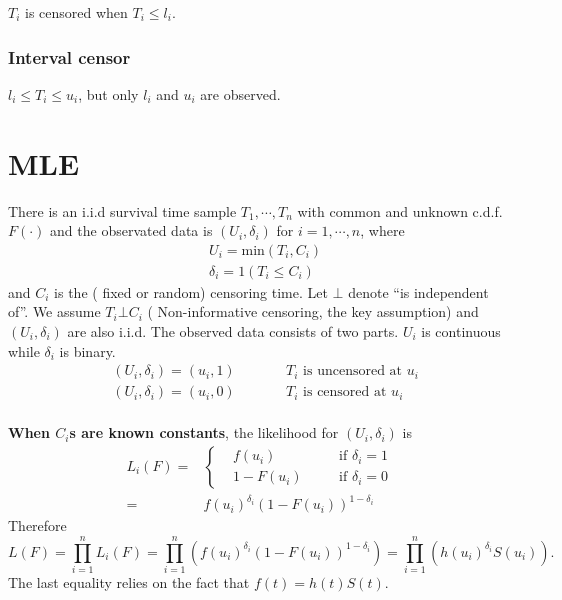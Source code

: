 \documentclass[a4paper,12pt]{article}
\begin{document}
$T_i$ is censored when $T_i \leq l_i$.

\subsubsection{Interval censor}
\label{sec:interval-censor}

$l_i \leq T_i \leq u_i$, but only $l_i$ and $u_i$ are observed.

\section{MLE}
\label{sec:mle}

There is an i.i.d survival time sample $T_1, \cdots, T_n$ with common and unknown c.d.f. $F\left(\cdot\right)$ and the observated data is $\left(U_i, \delta_i\right)$ for $i = 1, \cdots, n$, where
\[
  \begin{aligned}
    & U_i = \mathrm{min}\left(T_i, C_i\right)    \\
    & \delta_i = 1\left(T_i \leq C_i\right)
  \end{aligned}
\]
and $C_i$ is the ({\color{red} fixed} or {\color{red} random}) censoring time. Let $\bot$ denote ``is independent of''. We assume $T_i\bot C_i$ ({\color{red} Non-informative censoring, the key assumption}) and $\left(U_i, \delta_i\right)$ are also i.i.d. The observed data consists of two parts. $U_i$ is continuous while $\delta_i$ is binary.
\[
  \begin{aligned}
    & \left(U_i, \delta_i\right) = \left(u_i, 1\right)
    && \quad\quad T_i \text{ is uncensored at } u_i    \\
    & \left(U_i, \delta_i\right) = \left(u_i, 0\right)
    && \quad\quad T_i \text{ is censored at } u_i    \\
  \end{aligned}
\]

\textbf{When $C_i$s are known constants}, the likelihood for $\left(U_i, \delta_i\right)$ is
\[
  \begin{aligned}
      L_i\left(F\right) =& \left\{
    \begin{aligned}
      & f\left(u_i\right) && \quad \text{if } \delta_i = 1    \\
      & 1 - F\left(u_i\right) && \quad \text{if } \delta_i = 0
    \end{aligned}
  \right.    \\
  =& f\left(u_i\right)^{\delta_i}\left(1 - F\left(u_i\right)\right)^{1 - \delta_i}
  \end{aligned}
\]
Therefore
\begin{equation}
  \label{eq:likelihood_core}
  L\left(F\right) = \prod\limits_{i = 1}^nL_i\left(F\right)
  = \prod\limits_{i = 1}^n\left(
    f\left(u_i\right)^{\delta_i}\left(1 - F\left(u_i\right)\right)^{1 - \delta_i}
  \right)
  = \prod\limits_{i = 1}^n\left(
    h\left(u_i\right)^{\delta_i}S\left(u_i\right)
  \right)
  .
\end{equation}
The last equality relies on the fact that $f\left(t\right) = h\left(t\right)S\left(t\right)$.
\end{document}
